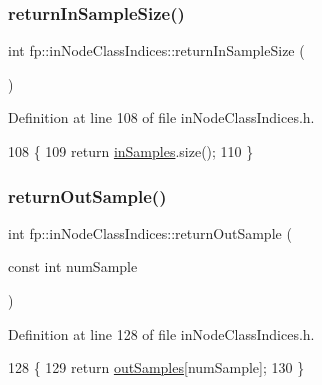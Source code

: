 \subsubsection{\texorpdfstring{return\+In\+Sample\+Size()}{returnInSampleSize()}}
{\footnotesize\ttfamily int fp\+::in\+Node\+Class\+Indices\+::return\+In\+Sample\+Size (\begin{DoxyParamCaption}{ }\end{DoxyParamCaption})\hspace{0.3cm}{\ttfamily [inline]}}



Definition at line 108 of file in\+Node\+Class\+Indices.\+h.


\begin{DoxyCode}
108                                            \{
109                 \textcolor{keywordflow}{return} \hyperlink{classfp_1_1inNodeClassIndices_ae830eec1ee5490f4fe4fb3d579ac78eb}{inSamples}.size();
110             \}
\end{DoxyCode}
\mbox{\label{classfp_1_1inNodeClassIndices_acb8799a2eb8c48a8f74a7aaff244028e}} 
\subsubsection{\texorpdfstring{return\+Out\+Sample()}{returnOutSample()}}
{\footnotesize\ttfamily int fp\+::in\+Node\+Class\+Indices\+::return\+Out\+Sample (\begin{DoxyParamCaption}\item[{const int}]{num\+Sample }\end{DoxyParamCaption})\hspace{0.3cm}{\ttfamily [inline]}}



Definition at line 128 of file in\+Node\+Class\+Indices.\+h.


\begin{DoxyCode}
128                                                            \{
129                 \textcolor{keywordflow}{return} \hyperlink{classfp_1_1inNodeClassIndices_afaa76dfa346ba9de197b1cbd7a1557f9}{outSamples}[numSample];
130             \}
\end{DoxyCode}
\mbox{\label{classfp_1_1inNodeClassIndices_ab360c9f6184c55a48550982aaf4b5e4a}} 
